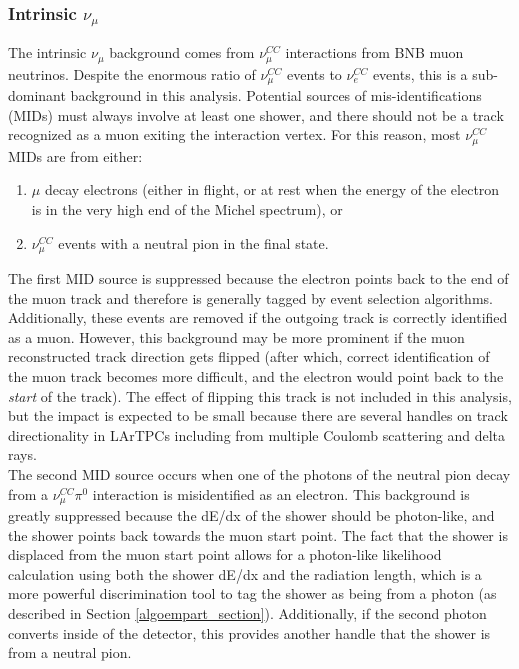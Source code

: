 \subsubsection{Intrinsic $\nu_\mu$}
The intrinsic $\nu_\mu$ background comes from $\nu_\mu^{CC}$ interactions from BNB muon neutrinos. Despite the enormous ratio of $\nu_\mu^{CC}$ events to $\nu_e^{CC}$ events, this is a sub-dominant background in this analysis. Potential sources of mis-identifications (MIDs) must always involve at least one shower, and there should not be a track recognized as a muon exiting the interaction vertex. For this reason, most $\nu_\mu^{CC}$ MIDs are from either:
\begin{enumerate}
\item $\mu$ decay electrons (either in flight, or at rest when the energy of the electron is in the very high end of the Michel spectrum), or 
\item $\nu_\mu^{CC}$ events with a neutral pion in the final state. 
\end{enumerate}
The first MID source is suppressed because the electron points back to the end of the muon track and therefore is generally tagged by event selection algorithms. Additionally, these events are removed if the outgoing track is correctly identified as a muon. However, this background may be more prominent if the muon reconstructed track direction gets flipped (after which, correct identification of the muon track becomes more difficult, and the electron would point back to the \textit{start} of the track). The effect of flipping this track is not included in this analysis, but the impact is expected to be small because there are several handles on track directionality in LArTPCs including from multiple Coulomb scattering and delta rays.\\

The second MID source occurs when one of the photons of the neutral pion decay from a $\nu_\mu^{CC}\pi^0$ interaction is misidentified as an electron. This background is greatly suppressed because the dE/dx of the shower should be photon-like, and the shower points back towards the muon start point. The fact that the shower is displaced from the muon start point allows for a photon-like likelihood calculation using both the shower dE/dx and the radiation length, which is a more powerful discrimination tool to tag the shower as being from a photon (as described in Section \ref{algoempart_section}). Additionally, if the second photon converts inside of the detector, this provides another handle that the shower is from a neutral pion.

